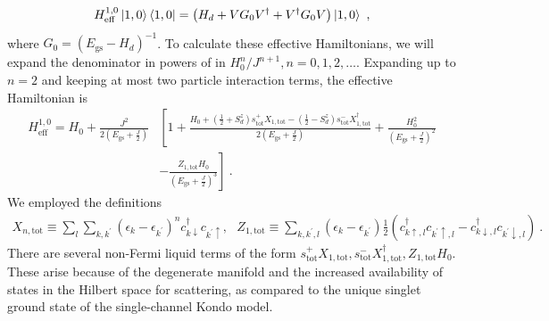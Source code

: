 \documentclass[12pt]{iopart}
\begin{document}
\begin{eqnarray}
	\label{eff_ham_10}
	H^{1,0}_\text{eff}\ket{1, 0}\bra{1, 0} = \left(H_d + V G_0 V^\dagger + V^\dagger G_0  V\right) \ket{1, 0}~,
\end{eqnarray}
where \(G_0 = \left(E_\text{gs} - H_d\right)^{-1}\). To calculate these effective Hamiltonians, we will expand the denominator in powers of in \(H_0^n/J^{n+1}, n=0,1,2,\ldots\). Expanding up to \(n=2\) and keeping at most two particle interaction terms, 
the effective Hamiltonian is
\begin{eqnarray}
	H_\text{eff}^{1, 0} = H_0 + \frac{J^2}{2\left(E_\text{gs} + \frac{J}{2}\right)}&\left[1 + \frac{ H_0 + \left(\frac{1}{2} + S_d^z\right) s^+_\text{tot}X_{1,\text{tot}} - \left(\frac{1}{2} - S_d^z\right) s^-_\text{tot}X^\dagger_{1,\text{tot}}}{2 \left(E_\text{gs} + \frac{J}{2}\right)} + \frac{H_0^2}{\left(E_\text{gs} + \frac{J}{2}\right)^2} \right.\nonumber\\
&\left.- \frac{Z_{1,\text{tot}} H_0}{\left(E_\text{gs} + \frac{J}{2}\right)^3} \right]~.
\end{eqnarray}
We employed the definitions 
\begin{eqnarray}
X_{n,\text{tot}} \equiv  \sum_l \sum_{k,k^\prime}\left(\epsilon_k - \epsilon_{k^\prime}\right)^n c^\dagger_{k \downarrow}c_{k^\prime \uparrow}, ~ ~ ~ Z_{1,\text{tot}} \equiv \sum_{k,k^\prime,l}\left( \epsilon_k - \epsilon_{k^\prime} \right) \frac{1}{2}\left(c^\dagger_{k \uparrow,l}c_{k^\prime \uparrow,l} - c^\dagger_{k \downarrow,l}c_{k^\prime \downarrow,l}\right)~.
\end{eqnarray}
There are several non-Fermi liquid terms of the form \(s^+_\text{tot}X_{1,\text{tot}}, s^-_\text{tot}X^\dagger_{1,\text{tot}},Z_{1,\text{tot}} H_0\). These arise because of the degenerate manifold and the increased availability of states in the Hilbert space for scattering, as compared to the unique singlet ground state of the single-channel Kondo model.
\end{document}
